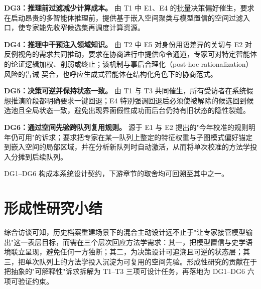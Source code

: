 \textbf{DG3：推理前过滤减少计算成本。} 由 T1 中 E1、E4 的批量决策偏好催生，要求在启动昂贵的多智能体推理前，提供基于嵌入空间聚类与模型置信的空间过滤入口，使专家能先收窄候选集再调度计算资源。

\textbf{DG4：推理中干预注入领域知识。} 由 T2 中 E5 对身份用语差异的关切与 E2 对反例视角的需求共同推动，要求在协商进行中提供命令通道，专家可对特定智能体的论证逻辑加权、削弱或终止；该机制与事后合理化（post-hoc rationalization）风险的告诫\citep{turpin2023faithfulness} 契合，也呼应生成式智能体在结构化角色下的协商范式\citep{park2023generative}。

\textbf{DG5：决策可逆并保持状态一致。} 由 T1 与 T3 共同催生，所有受访者在系统假想推演阶段都明确要求一键回退；E4 特别强调回退后必须使被解除的候选回到候选池且全局状态一致，避免出现界面假性成功而后台仍持有旧状态的隐性裂缝。

\textbf{DG6：通过空间先验跨队列复用规则。} 源于 E1 与 E2 提出的"今年校准的规则明年仍可用"的诉求；要求把专家在某一队列上整定的特征权重与子图模式偏好锚定到嵌入空间的局部区域，并在分析新队列时自动激活，从而将单次校准的方法学投入分摊到后续队列。

DG1--DG6 构成本系统设计契约，下游章节的取舍均可回溯至其中之一。

\section{形成性研究小结}\label{sec:formative-summary}

综合访谈可知，历史档案重建场景下的混合主动设计远不止于"让专家接管模型输出"这一表层目标，而需在三个层次回应方法学需求：其一，把模型置信与史学语境联立呈现，避免任何一方独断；其二，为决策设计可追溯且可逆的状态层；其三，把单次队列上的方法学投入沉淀为可复用的空间先验。形成性研究的贡献在于把抽象的"可解释性"诉求拆解为 T1--T3 三项可设计任务，再落地为 DG1--DG6 六项可验证约束。
